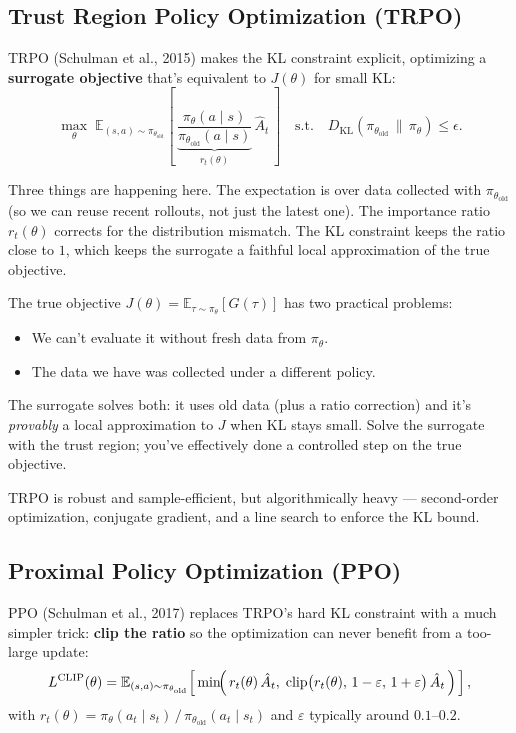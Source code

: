 \documentclass[11pt, oneside]{book}
\newcommand{\E}{\mathbb{E}}              %
\newcommand{\KL}[2]{D_{\mathrm{KL}}\!\left(#1 \,\|\, #2\right)}
\begin{document}
\subsection{Trust Region Policy Optimization (TRPO)}

TRPO (Schulman et al., 2015) makes the KL constraint explicit, optimizing a
\textbf{surrogate objective} that's equivalent to $J(\theta)$ for small KL:
\[
  \max_\theta\; \E_{(s,a) \sim \pi_{\theta_{\text{old}}}}\!\left[\, \underbrace{\frac{\pi_\theta(a \mid s)}{\pi_{\theta_{\text{old}}}(a \mid s)}}_{r_t(\theta)}\, \hat A_t\, \right]
  \quad \text{s.t.} \quad \KL{\pi_{\theta_{\text{old}}}}{\pi_\theta} \le \epsilon.
\]

Three things are happening here.
The expectation is over data collected with $\pi_{\theta_{\text{old}}}$ (so we can reuse
recent rollouts, not just the latest one).
The importance ratio $r_t(\theta)$ corrects for the distribution mismatch.
The KL constraint keeps the ratio close to $1$, which keeps the surrogate a faithful
local approximation of the true objective.

\begin{intbox}[title={Why a surrogate objective?}]
The true objective $J(\theta) = \E_{\tau \sim \pi_\theta}[G(\tau)]$ has two practical
problems:
\begin{itemize}
  \item We can't evaluate it without fresh data from $\pi_\theta$.
  \item The data we have was collected under a different policy.
\end{itemize}
The surrogate solves both: it uses old data (plus a ratio correction) and it's
\emph{provably} a local approximation to $J$ when KL stays small. Solve the surrogate
with the trust region; you've effectively done a controlled step on the true objective.
\end{intbox}

TRPO is robust and sample-efficient, but algorithmically heavy --- second-order
optimization, conjugate gradient, and a line search to enforce the KL bound.

\subsection{Proximal Policy Optimization (PPO)}

PPO (Schulman et al., 2017) replaces TRPO's hard KL constraint with a much simpler
trick: \textbf{clip the ratio} so the optimization can never benefit from a too-large
update:
\[
  L^{\text{CLIP}}(\theta)
  = \E_{(s,a) \sim \pi_{\theta_{\text{old}}}}\!\left[\, \min\!\Bigl(\, r_t(\theta)\, \hat A_t,\; \mathrm{clip}\bigl(r_t(\theta),\, 1-\varepsilon,\, 1+\varepsilon\bigr)\, \hat A_t\, \Bigr)\, \right],
\]
with $r_t(\theta) = \pi_\theta(a_t \mid s_t)\,/\,\pi_{\theta_{\text{old}}}(a_t \mid s_t)$
and $\varepsilon$ typically around $0.1$--$0.2$.
\end{document}
